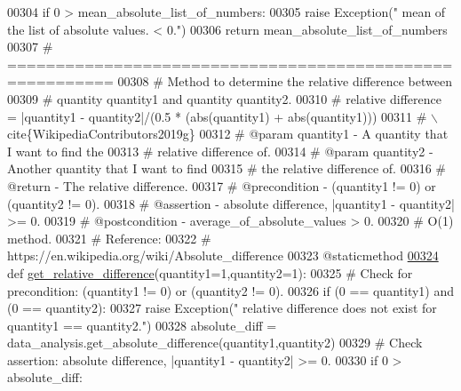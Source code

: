 \begin{DoxyCode}
{00304             \textcolor{keywordflow}{if} 0 > mean\_absolute\_list\_of\_numbers:
00305                 \textcolor{keywordflow}{raise} Exception(\textcolor{stringliteral}{"   mean of the list of absolute values. < 0."})
00306             \textcolor{keywordflow}{return} mean\_absolute\_list\_of\_numbers
00307     \textcolor{comment}{# =========================================================}
00308     \textcolor{comment}{#   Method to determine the relative difference between}
00309     \textcolor{comment}{#       quantity quantity1 and quantity quantity2.}
00310     \textcolor{comment}{#   relative difference = |quantity1 - quantity2|/(0.5 * (abs(quantity1) + abs(quantity1)))}
00311     \textcolor{comment}{#   \(\backslash\)cite\{WikipediaContributors2019g\}}
00312     \textcolor{comment}{#   @param quantity1 - A quantity that I want to find the}
00313     \textcolor{comment}{#       relative difference of.}
00314     \textcolor{comment}{#   @param quantity2 - Another quantity that I want to find}
00315     \textcolor{comment}{#       the relative difference of.}
00316     \textcolor{comment}{#   @return - The relative difference.}
00317     \textcolor{comment}{#   @precondition - (quantity1 != 0) or (quantity2 != 0).}
00318     \textcolor{comment}{#   @assertion - absolute difference, |quantity1 - quantity2| >= 0.}
00319     \textcolor{comment}{#   @postcondition - average\_of\_absolute\_values > 0.}
00320     \textcolor{comment}{#   O(1) method.}
00321     \textcolor{comment}{#   Reference:}
00322     \textcolor{comment}{#       https://en.wikipedia.org/wiki/Absolute\_difference}
00323     @staticmethod
\hypertarget{data__analysis__tool_8py_source_l00324}{}\hyperlink{classstatistics_1_1data__analysis__tool_1_1data__analysis_a04973a814dd603d6603da8c4d21ea1d8}{00324}     \textcolor{keyword}{def }\hyperlink{classstatistics_1_1data__analysis__tool_1_1data__analysis_a04973a814dd603d6603da8c4d21ea1d8}{get\_relative\_difference}(quantity1=1,quantity2=1):
00325         \textcolor{comment}{# Check for precondition: (quantity1 != 0) or (quantity2 != 0).}
00326         \textcolor{keywordflow}{if} (0 == quantity1) \textcolor{keywordflow}{and} (0 == quantity2):
00327             \textcolor{keywordflow}{raise} Exception(\textcolor{stringliteral}{"   relative difference does not exist for quantity1 == quantity2."})
00328         absolute\_diff = data\_analysis.get\_absolute\_difference(quantity1,quantity2)
00329         \textcolor{comment}{# Check assertion: absolute difference, |quantity1 - quantity2| >= 0.}
00330         \textcolor{keywordflow}{if} 0 > absolute\_diff:
}
\end{DoxyCode}
